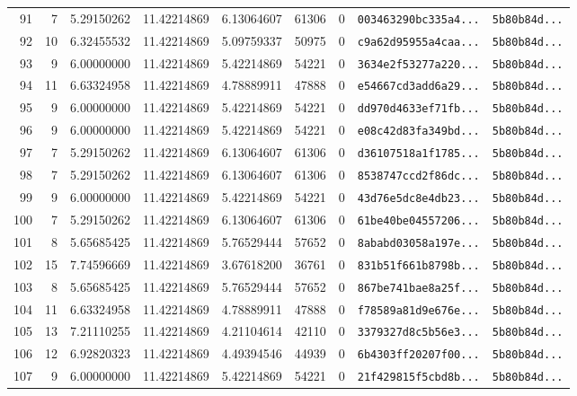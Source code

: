 \documentclass[10pt]{article}
\begin{document}
\begin{longtable}{rrrrrrrll}
  91 & 7 & 5.29150262 & 11.42214869 & 6.13064607 & 61306 & 0 & \texttt{003463290bc335a4...} & \texttt{5b80b84d...} \\
  92 & 10 & 6.32455532 & 11.42214869 & 5.09759337 & 50975 & 0 & \texttt{c9a62d95955a4caa...} & \texttt{5b80b84d...} \\
  93 & 9 & 6.00000000 & 11.42214869 & 5.42214869 & 54221 & 0 & \texttt{3634e2f53277a220...} & \texttt{5b80b84d...} \\
  94 & 11 & 6.63324958 & 11.42214869 & 4.78889911 & 47888 & 0 & \texttt{e54667cd3add6a29...} & \texttt{5b80b84d...} \\
  95 & 9 & 6.00000000 & 11.42214869 & 5.42214869 & 54221 & 0 & \texttt{dd970d4633ef71fb...} & \texttt{5b80b84d...} \\
  96 & 9 & 6.00000000 & 11.42214869 & 5.42214869 & 54221 & 0 & \texttt{e08c42d83fa349bd...} & \texttt{5b80b84d...} \\
  97 & 7 & 5.29150262 & 11.42214869 & 6.13064607 & 61306 & 0 & \texttt{d36107518a1f1785...} & \texttt{5b80b84d...} \\
  98 & 7 & 5.29150262 & 11.42214869 & 6.13064607 & 61306 & 0 & \texttt{8538747ccd2f86dc...} & \texttt{5b80b84d...} \\
  99 & 9 & 6.00000000 & 11.42214869 & 5.42214869 & 54221 & 0 & \texttt{43d76e5dc8e4db23...} & \texttt{5b80b84d...} \\
  100 & 7 & 5.29150262 & 11.42214869 & 6.13064607 & 61306 & 0 & \texttt{61be40be04557206...} & \texttt{5b80b84d...} \\
  101 & 8 & 5.65685425 & 11.42214869 & 5.76529444 & 57652 & 0 & \texttt{8ababd03058a197e...} & \texttt{5b80b84d...} \\
  102 & 15 & 7.74596669 & 11.42214869 & 3.67618200 & 36761 & 0 & \texttt{831b51f661b8798b...} & \texttt{5b80b84d...} \\
  103 & 8 & 5.65685425 & 11.42214869 & 5.76529444 & 57652 & 0 & \texttt{867be741bae8a25f...} & \texttt{5b80b84d...} \\
  104 & 11 & 6.63324958 & 11.42214869 & 4.78889911 & 47888 & 0 & \texttt{f78589a81d9e676e...} & \texttt{5b80b84d...} \\
  105 & 13 & 7.21110255 & 11.42214869 & 4.21104614 & 42110 & 0 & \texttt{3379327d8c5b56e3...} & \texttt{5b80b84d...} \\
  106 & 12 & 6.92820323 & 11.42214869 & 4.49394546 & 44939 & 0 & \texttt{6b4303ff20207f00...} & \texttt{5b80b84d...} \\
  107 & 9 & 6.00000000 & 11.42214869 & 5.42214869 & 54221 & 0 & \texttt{21f429815f5cbd8b...} & \texttt{5b80b84d...} \\

\end{longtable}
\end{document}
